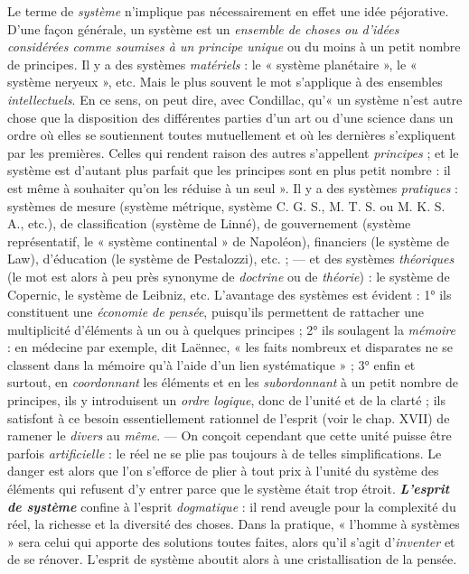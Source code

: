 Le terme de {\it système} n'implique pas nécessairement en effet une
idée péjorative. D’une façon générale, un système est un {\it ensemble
de choses ou d'idées considérées comme soumises à un principe unique}
ou du moins à un petit nombre de principes. Il y a des systèmes
{\it matériels} : le « système planétaire », le « système neryeux », etc.
Mais le plus souvent le mot s'applique à des ensembles {\it intellectuels}.
En ce sens, on peut dire, avec Condillac, qu'« un système n'est
autre chose que la disposition des différentes parties d’un art ou d’une
science dans un ordre où elles se soutiennent toutes mutuellement
et où les dernières s'expliquent par les premières. Celles qui rendent
raison des autres s'appellent {\it principes} ; et le système est d'autant
plus parfait que les principes sont en plus petit nombre : il est même
à souhaiter qu’on les réduise à un seul ». Il y a des systèmes {\it pratiques}
 : systèmes de mesure (système métrique, système C. G. S., M. T. S.
ou M. K. S. A., etc.), de classification (système de Linné), de gouvernement
(système représentatif, le « système continental » de Napoléon),
financiers (le système de Law), d'éducation (le système de Pestalozzi),
etc. ; — et des systèmes {\it théoriques} (le mot est alors à peu près
synonyme de {\it doctrine} ou de {\it théorie}) : le système de Copernic, le
système de Leibniz, etc. L'avantage des systèmes est évident : 1° ils
constituent une {\it économie de pensée}, puisqu'ils permettent de rattacher
une multiplicité d'éléments à un ou à quelques principes ;
2° ils soulagent la {\it mémoire} : en médecine par exemple, dit Laënnec,
« les faits nombreux et disparates ne se classent dans la mémoire qu’à
l’aide d’un lien systématique » ; 3° enfin et surtout, en {\it coordonnant} les
éléments et en les {\it subordonnant} à un petit nombre de principes, ils y
introduisent un {\it ordre logique}, donc de l’unité et de la clarté ; ils satisfont
à ce besoin essentiellement rationnel de l'esprit (voir le
chap. XVII) de ramener le {\it divers} au {\it même}. — On conçoit cependant
que cette unité puisse être parfois {\it artificielle} : le réel ne se plie pas
toujours à de telles simplifications. Le danger est alors que l’on
s'efforce de plier à tout prix à l’unité du système des éléments qui
refusent d’y entrer parce que le système était trop étroit. \textbf{\textit {L'esprit
de système}} confine à l’esprit {\it dogmatique} : il rend aveugle pour la
complexité du réel, la richesse et la diversité des choses. Dans la pratique,
« l’homme à systèmes » sera celui qui apporte des solutions
toutes faites, alors qu’il s’agit d’{\it inventer} et de se rénover. L'esprit
de système aboutit alors à une cristallisation de la pensée.

